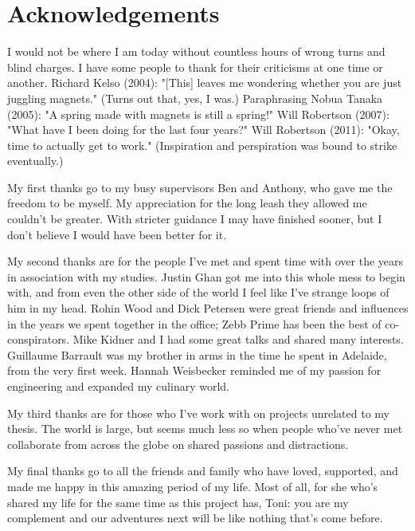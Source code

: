 
\section{Acknowledgements}

I would not be where I am today without countless hours of wrong turns and
blind charges.
I have some people to thank for their criticisms at one time or another.
Richard Kelso (2004): "[This] leaves me wondering whether you are just juggling magnets." (Turns out that, yes, I was.)
Paraphrasing Nobua Tanaka (2005): "A spring made with magnets is still a spring!"
Will Robertson (2007): "What have I been doing for the last four years?"
Will Robertson (2011): "Okay, time to actually get to work."
(Inspiration and perspiration was bound to strike eventually.)

My first thanks go to my busy supervisors Ben and Anthony, who gave me the freedom to be myself.
My appreciation for the long leash they allowed me couldn't be greater.
With stricter guidance I may have finished sooner, but I don't believe I would have been better for it.

My second thanks are for the people I've met and spent time with over the years in association with my studies.
Justin Ghan got me into this whole mess to begin with, and from even the other side of the world I feel like I've strange loops of him in my head.
Rohin Wood and Dick Petersen were great friends and influences in the years we spent together in the office; Zebb Prime has been the best of co-conspirators. Mike Kidner and I had some great talks and shared many interests.
Guillaume Barrault was my brother in arms in the time he spent in Adelaide, from the very first week.
Hannah Weisbecker reminded me of my passion for engineering and expanded my culinary world.

My third thanks are for those who I've work with on projects unrelated to my thesis.
The world is large, but seems much less so when people who've never met collaborate from across the globe on shared passions and distractions.

My final thanks go to all the friends and family who have loved, supported,
and made me happy in this amazing period of my life.
Most of all, for she who's shared my life for the same time as this project has, Toni: you are my complement and our adventures next will be like nothing that's come before.
